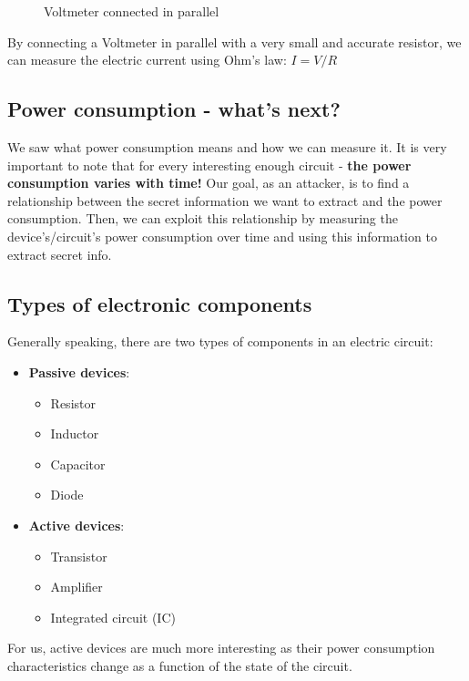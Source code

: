 \begin{figure}[!ht]
    \centering
    
    \caption{Voltmeter connected in parallel} \label{fig:circuit8}
\end{figure}

By connecting a Voltmeter in parallel with a very small and accurate resistor, we can measure the electric current
using Ohm's law: $I=V/R$
 
\subsection{Power consumption - what's next?}
We saw what power consumption means and how we can measure it. It is very important to
note that for every interesting enough circuit - \textbf{the power consumption varies with time!} 
Our goal, as an attacker, is to find a relationship between the secret information we want to extract and the
power consumption. Then, we can exploit this relationship by measuring the device's/circuit's power consumption 
over time and using this information to extract secret info.

\subsection{Types of electronic components}

Generally speaking, there are two types of components in an electric circuit:
\begin{itemize}
    \item \textbf{Passive devices}: 
    \begin{itemize}
        \item Resistor
        \item Inductor
        \item Capacitor
        \item Diode
    \end{itemize}
    \item \textbf{Active devices}:
    \begin{itemize}
        \item Transistor
        \item Amplifier
        \item Integrated circuit (IC)
    \end{itemize}
\end{itemize}
For us, active devices are much more interesting as their power consumption characteristics change
as a function of the state of the circuit.

